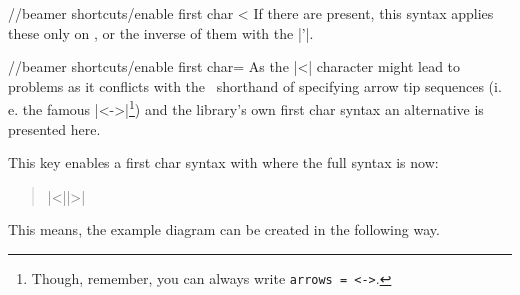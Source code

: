 \begin{multicols*}{2}
\begin{key}{/\tikzext/beamer shortcuts/enable first char <}
  If there are  present, this syntax applies these only on ,
  or the inverse of them with the |'|.
\end{key}
\begin{key}{/\tikzext/beamer shortcuts/enable first char=}
  As the |<| character might lead to problems as it conflicts with the \tikzname\ shorthand
  of specifying arrow tip sequences
  (i.\,e. the famous |<->|\footnote{Though, remember, you can always write \texttt{arrows = <->}.})
  and the  library's own first char syntax
  an alternative is presented here.
  
  This key enables a first char syntax with  where the full syntax is now:
  \begin{quote}
      |<||>|
  \end{quote}
  
  This means, the example diagram can be created in the following way.
\begin{codeexample}[preamble=\usetikzlibrary{ext.beamer} \setbeamercovered{transparent},code only]
\end{codeexample}
\end{key}
\end{multicols*}
\endinput